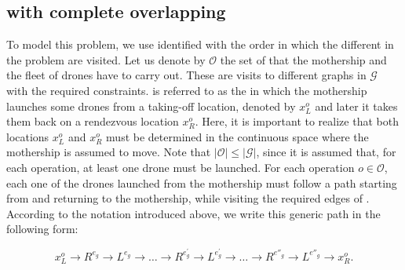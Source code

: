 \subsection{\AMD\xspace  with complete overlapping} \label{subsec:CO}
\noindent
To model this problem, we use  identified with the order in which the different  in the problem are visited. Let us denote by $\mathcal O$ the set of  that the mothership and the fleet of drones have to carry out. These  are visits to different graphs in $\mathcal G$ with the required constraints.  is referred to as the  in which the mothership launches some drones from a taking-off location, denoted by $x_L^o$ and later it takes them back on a rendezvous location $x_R^o$. Here, it is important to realize that both locations $x_L^o$ and $x_R^o$ must be determined in the continuous space where the mothership is assumed to move. Note that $|\mathcal O|\leq|\mathcal G|$, since it is assumed that, for each operation, at least one drone must be launched.
\noindent
For each operation $o\in\mathcal O$, each one of the drones launched from the mothership must follow a path starting from and returning to the mothership, while visiting the required edges of . According to the notation introduced above, we write this generic path in the following form:

$$
x_L^o\rightarrow R^{e_g}\rightarrow L^{e_g}\rightarrow\ldots\rightarrow R^{e^\prime_g}\rightarrow L^{e^\prime_g}\rightarrow \ldots \rightarrow R^{e''_g}  \rightarrow L^{e''_g} \rightarrow x_R^o. %
$$



